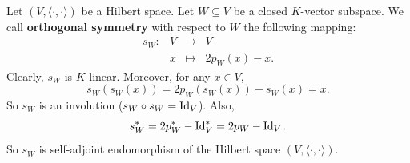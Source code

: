 \begin{exampleenv}
    Let $(V,\langle\cdot,\cdot\rangle)$ be a Hilbert space.
    Let $W \subseteq V$ be a closed $K$-vector subspace.
    We call \textbf{orthogonal symmetry} with respect to $W$ the following mapping:
    $$ \begin{array}{rrcl}
        s_W: & V & \rightarrow & V\\
        & x & \mapsto & 2p_W(x) - x.
    \end{array}$$
    Clearly, $s_W$ is $K$-linear.
    Moreover, for any $x\in V$,
    $$ s_W\left(s_W (x)\right) = 2p_W\left(s_W(x)\right) - s_W(x) = x.$$
    So $s_W$ is an involution ($s_W\circ s_W = \operatorname{\mathrm{Id}}_V$).
    Also, 
    $$ s_W^* = 2p_W^* - \operatorname{\mathrm{Id}}_V^* = 2p_W - \operatorname{\mathrm{Id}}_V.$$
    So $s_W$ is self-adjoint endomorphism of the Hilbert space $\left(V,\langle \cdot,\cdot\rangle\right)$.
\end{exampleenv}
